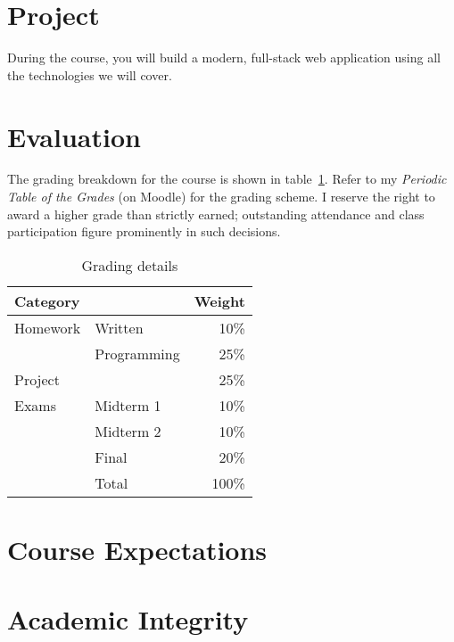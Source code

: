 \documentclass[11pt]{article}
\begin{document}
\section{Project}

During the course,
you will build a modern, full-stack web application
using all the technologies we will cover.

\section{Evaluation}

The grading breakdown for the course
is shown in table~\ref{tab:grading}.
Refer to my \emph{Periodic Table of the Grades} (on Moodle)
for the grading scheme.
I reserve the right to award a higher grade than strictly earned;
outstanding attendance and class participation
figure prominently in such decisions.

\begin{table}[htb]
  \centering
  \begin{tabular}{llr}
    \toprule
    Category &             & Weight \\
    \midrule
    Homework & Written     & 10\%   \\
             & Programming & 25\%   \\
    Project  &             & 25\%   \\
    Exams    & Midterm 1   & 10\%   \\
             & Midterm 2   & 10\%   \\
             & Final       & 20\%   \\
    \midrule
             & Total       & 100\%  \\
    \bottomrule
  \end{tabular}
  \caption{Grading details}
  \label{tab:grading}
\end{table}
\begin{comment}
#+ORGTBL: SEND grades orgtbl-to-latex :splice nil :skip 0 :booktabs t
| Category |             | Weight |
|          |             |    <r> |
|----------+-------------+--------|
| Homework | Written     |    10%
|          | Programming |    25%
| Project  |             |    25%
| Exams    | Midterm 1   |    10%
|          | Midterm 2   |    10%
|          | Final       |    20%
|----------+-------------+--------|
|          | Total       |   100%
#+TBLFM: @9$3=100*vsum(@I..II);%
\end{comment}

\newpage
\section{Course Expectations}



\section{Academic Integrity}



\printbibliography{}\label{sec:references}
\end{document}
